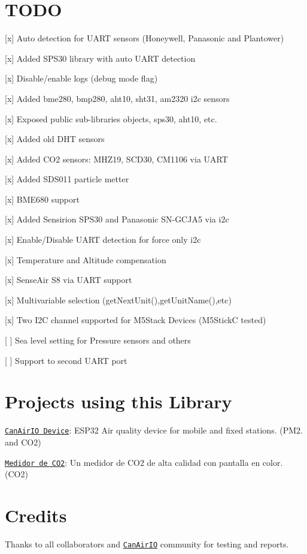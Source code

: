 \section*{T\+O\+DO}


\begin{DoxyItemize}
\item \mbox{[}x\mbox{]} Auto detection for U\+A\+RT sensors (Honeywell, Panasonic and Plantower)
\item \mbox{[}x\mbox{]} Added S\+P\+S30 library with auto U\+A\+RT detection
\item \mbox{[}x\mbox{]} Disable/enable logs (debug mode flag)
\item \mbox{[}x\mbox{]} Added bme280, bmp280, aht10, sht31, am2320 i2c sensors
\item \mbox{[}x\mbox{]} Exposed public sub-\/libraries objects, sps30, aht10, etc.
\item \mbox{[}x\mbox{]} Added old D\+HT sensors
\item \mbox{[}x\mbox{]} Added C\+O2 sensors\+: M\+H\+Z19, S\+C\+D30, C\+M1106 via U\+A\+RT
\item \mbox{[}x\mbox{]} Added S\+D\+S011 particle metter
\item \mbox{[}x\mbox{]} B\+M\+E680 support
\item \mbox{[}x\mbox{]} Added Sensirion S\+P\+S30 and Panasonic S\+N-\/\+G\+C\+J\+A5 via i2c
\item \mbox{[}x\mbox{]} Enable/\+Disable U\+A\+RT detection for force only i2c
\item \mbox{[}x\mbox{]} Temperature and Altitude compensation
\item \mbox{[}x\mbox{]} Sense\+Air S8 via U\+A\+RT support
\item \mbox{[}x\mbox{]} Multivariable selection (get\+Next\+Unit(),get\+Unit\+Name(),etc)
\item \mbox{[}x\mbox{]} Two I2C channel supported for M5\+Stack Devices (M5\+StickC tested)
\item \mbox{[} \mbox{]} Sea level setting for Pressure sensors and others
\item \mbox{[} \mbox{]} Support to second U\+A\+RT port
\end{DoxyItemize}

\section*{Projects using this Library}


\begin{DoxyItemize}
\item \href{https://github.com/kike-canaries/canairio_firmware}{\tt Can\+Air\+IO Device}\+: E\+S\+P32 Air quality device for mobile and fixed stations. (P\+M2. and C\+O2)
\item \href{https://emariete.com/medidor-co2-display-tft-color-ttgo-t-display-sensirion-scd30}{\tt Medidor de C\+O2}\+: Un medidor de C\+O2 de alta calidad con pantalla en color. (C\+O2)
\end{DoxyItemize}

\section*{Credits}

Thanks to all collaborators and \href{https://canair.io}{\tt Can\+Air\+IO} community for testing and reports. 

 